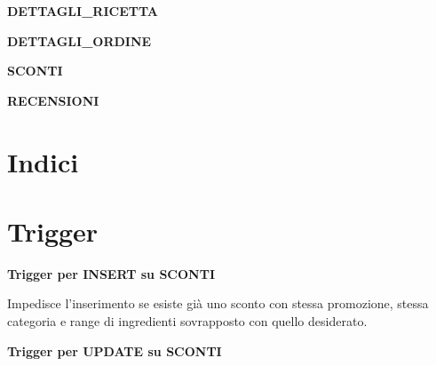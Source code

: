 \vspace{2em}
\textbf{DETTAGLI\_RICETTA}



\vspace{2em}
\textbf{DETTAGLI\_ORDINE}



\vspace{2em}
\textbf{SCONTI}



\vspace{2em}
\textbf{RECENSIONI}


\vspace{1em}

\section{Indici}


\vspace{1em}

\section{Trigger}

\vspace{2em}
\textbf{Trigger per INSERT su SCONTI}

Impedisce l'inserimento se esiste già uno sconto con stessa promozione, stessa categoria e range di ingredienti sovrapposto con quello desiderato.



\vspace{3em}
\textbf{Trigger per UPDATE su SCONTI}

